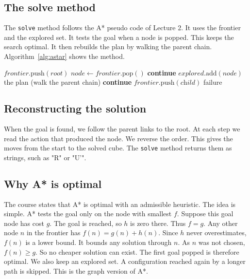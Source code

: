 \documentclass[11pt,a4paper]{article}
\begin{document}
\subsection{The solve method}

The \texttt{solve} method follows the A* pseudo code of Lecture 2. It uses the
frontier and the explored set. It tests the goal when a node is popped. This
keeps the search optimal. It then rebuilds the plan by walking the parent chain.
Algorithm~\ref{alg:astar} shows the method.

\begin{algorithm}[H]
\caption{The A* search, as implemented in solve.}
\label{alg:astar}
\begin{algorithmic}[1]
\State $\textit{frontier}.\text{push}(\textit{root})$
    \State $\textit{node} \gets \textit{frontier}.\text{pop}()$ 
        \State \textbf{continue}
    \EndIf
    \State $\textit{explored}.\text{add}(\textit{node})$
        \State \Return the plan (walk the parent chain)
    \EndIf
     
            \State \textbf{continue}
        \EndIf
        \State $\textit{frontier}.\text{push}(\textit{child})$
    \EndFor
\EndWhile
\State \Return failure
\end{algorithmic}
\end{algorithm}

\subsection{Reconstructing the solution}

When the goal is found, we follow the parent links to the root. At each step we
read the action that produced the node. We reverse the order. This gives the moves
from the start to the solved cube. The \texttt{solve} method returns them as
strings, such as "R" or "U'".

\subsection{Why A* is optimal}

The course states that A* is optimal with an admissible heuristic. The idea is
simple. A* tests the goal only on the node with smallest $f$. Suppose this goal
node has cost $g$. The goal is reached, so $h$ is zero there. Thus $f = g$. Any
other node $n$ in the frontier has $f(n) = g(n) + h(n)$. Since $h$ never
overestimates, $f(n)$ is a lower bound. It bounds any solution through $n$. As $n$
was not chosen, $f(n) \ge g$. So no cheaper solution can exist. The first goal
popped is therefore optimal. We also keep an explored set. A configuration reached
again by a longer path is skipped. This is the graph version of A*.
\end{document}
